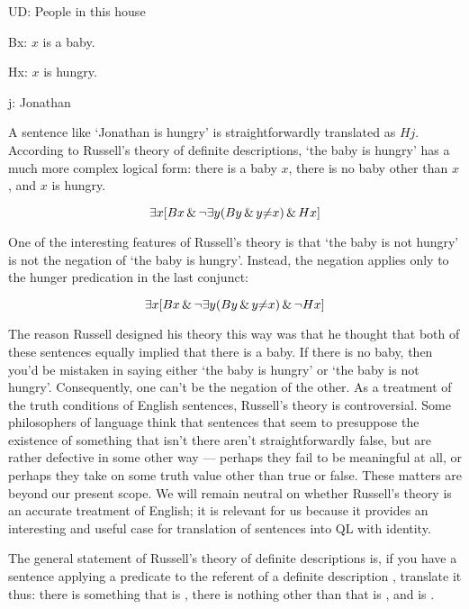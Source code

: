 \begin{ekey}
\item[UD:]People in this house
\item[Bx:]$x$ is a baby.
\item[Hx:]$x$ is hungry.
\item[j:]Jonathan
\end{ekey}

A sentence like `Jonathan is hungry' is straightforwardly translated as $Hj$. According to Russell's theory of definite descriptions, `the baby is hungry' has a much more complex logical form: there is a baby $x$, there is no baby other than $x$, and $x$ is hungry.

\begin{equation*}
\exists x [Bx \,\&\, \neg \exists y (By \,\&\, y {\neq} x) \,\&\, Hx]
\end{equation*}

One of the interesting features of Russell's theory is that `the baby is not hungry' is not the negation of `the baby is hungry'. Instead, the negation applies only to the hunger predication in the last conjunct:

\begin{equation*}
\exists x [Bx \,\&\, \neg \exists y (By \,\&\, y {\neq} x) \,\&\, \neg Hx]
\end{equation*}

The reason Russell designed his theory this way was that he thought that both of these sentences equally implied that there is a baby. If there is no baby, then you'd be mistaken in saying either `the baby is hungry' or `the baby is not hungry'. Consequently, one can't be the negation of the other. As a treatment of the truth conditions of English sentences, Russell's theory is controversial. Some philosophers of language think that sentences that seem to presuppose the existence of something that isn't there aren't straightforwardly false, but are rather defective in some other way --- perhaps they fail to be meaningful at all, or perhaps they take on some truth value other than true or false. These matters are beyond our present scope. We will remain neutral on whether Russell's theory is an accurate treatment of English; it is relevant for us because it provides an interesting and useful case for translation of sentences into QL with identity.

The general statement of Russell's theory of definite descriptions is, if you have a sentence applying a predicate  to the referent of a definite description , translate it thus: there is something  that is , there is nothing other than  that is , and  is .


